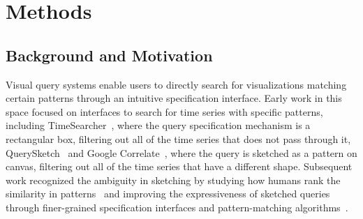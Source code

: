 \section{Methods\label{sec:methods}}
\subsection{Background and Motivation}
\par Visual query systems enable users to directly search for visualizations matching certain patterns through an intuitive specification interface. Early work in this space focused on interfaces to search for time series with specific patterns, including TimeSearcher~\cite{Hochheiser2001,Hochheiser2004}, where the query specification mechanism is a rectangular box, filtering out all of the time series that does not pass through it, QuerySketch~\cite{wattenberg2001sketching} and Google Correlate~\cite{mohebbi2011google}, where the query is sketched as a pattern on canvas, filtering out all of the time series that have a different shape. Subsequent work recognized the ambiguity in sketching by studying how humans rank the similarity in patterns~\cite{Eichmann2015,correll2016semantics,Mannino2018} and improving the expressiveness of sketched queries through finer-grained specification interfaces and pattern-matching algorithms~\cite{ryall2005querylines,Holz2009}.
